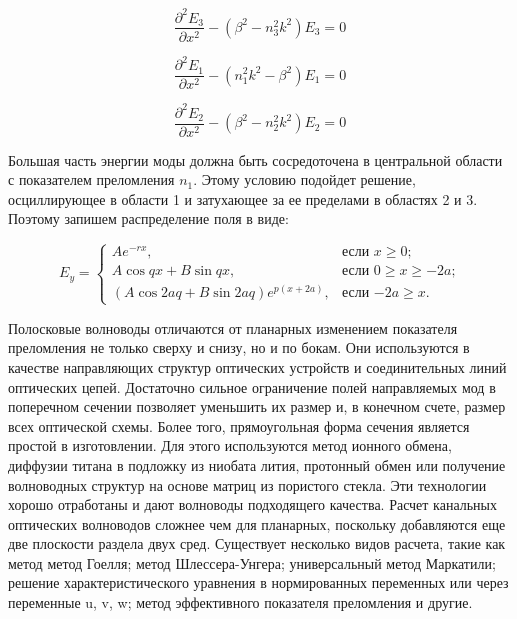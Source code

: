 \begin{equation}
	\frac{\partial^2 E_3}{\partial x^2} -(\beta^2 - n_3^2 k^2)E_3 = 0
\end{equation}

\begin{equation}
	\frac{\partial^2 E_1}{\partial x^2} -(n_1^2 k^2 - \beta^2)E_1 = 0
\end{equation}

\begin{equation}
	\frac{\partial^2 E_2}{\partial x^2} -(\beta^2 - n_2^2 k^2)E_2 = 0
\end{equation}

Большая часть энергии моды должна быть сосредоточена в центральной области с показателем преломления $n_1$. Этому условию подойдет решение, осциллирующее в области 1 и затухающее за ее пределами в областях 2 и 3. Поэтому запишем распределение поля в виде:

\begin{equation}
	E_y =
	\begin{cases}
		Ae^{-rx}, &\text{если $x \geqslant 0$;}\\
		A\cos qx + B\sin qx, &\text{если $0 \geqslant x \geqslant -2a $;}\\
		(A\cos 2aq + B\sin 2aq)e^{p(x+2a)}, &\text{если $-2a \geqslant x$.}
	\end{cases}
\end{equation}

Полосковые волноводы отличаются от планарных изменением показателя преломления не только сверху и снизу, но и по бокам. Они используются в качестве направляющих структур оптических устройств и соединительных линий оптических цепей. Достаточно сильное ограничение полей направляемых мод в поперечном сечении позволяет уменьшить их размер и, в конечном счете, размер всех оптической схемы. Более того, прямоугольная форма сечения является простой в изготовлении. Для этого используются метод ионного обмена, диффузии титана в подложку из ниобата лития, протонный обмен или получение волноводных структур на основе матриц из пористого стекла\cite{vlada}. Эти технологии хорошо отработаны и дают волноводы подходящего качества.
Расчет канальных оптических волноводов сложнее чем для планарных, поскольку добавляются еще две плоскости раздела двух сред. Существует несколько видов расчета, такие как метод метод Гоелля; метод Шлессера-Унгера; универсальный метод Маркатили; решение характеристического уравнения в нормированных переменных или через переменные u, v, w; метод эффективного показателя преломления и другие.

